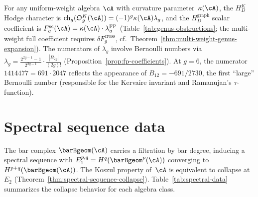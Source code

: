 \noindent
For any uniform-weight algebra $\cA$ with curvature
parameter~$\kappa(\cA)$, the $H_D^K$ Hodge character is
$\operatorname{ch}_g(\mathfrak O_g^K(\cA))=
(-1)^g\kappa(\cA)\lambda_g$, and the $H_D^{\mathrm{graph}}$ scalar
coefficient is
$F_g^{\mathrm{sc}}(\cA)=\kappa(\cA)\cdot\lambda_g^{\mathrm{FP}}$
(Table~\ref{tab:genus-obstructions}; the multi-weight full coefficient
requires $\delta F_g^{\mathrm{cross}}$,
cf.~Theorem~\ref{thm:multi-weight-genus-expansion}). The numerators of
$\lambda_g$ involve Bernoulli numbers via
$\lambda_g = \tfrac{2^{2g-1}-1}{2^{2g-1}} \cdot
\tfrac{|B_{2g}|}{(2g)!}$
(Proposition~\ref{prop:fp-coefficients}).
At $g = 6$, the numerator $1414477 = 691 \cdot 2047$ reflects the
appearance of $B_{12} = -691/2730$, the first ``large'' Bernoulli
number (responsible for the Kervaire invariant and Ramanujan's
$\tau$-function).

\section*{Spectral sequence data}
\label{sec:spectral-sequence-data}

The bar complex $\barBgeom(\cA)$ carries a filtration by bar degree,
inducing a spectral sequence with
$E_1^{p,q} = H^q(\barBgeom^p(\cA))$
converging to $H^{p+q}(\barBgeom(\cA))$.
The Koszul property of~$\cA$ is equivalent to collapse at~$E_2$
(Theorem~\ref{thm:spectral-sequence-collapse}).
Table~\ref{tab:spectral-data} summarizes the collapse behavior
for each algebra class.

